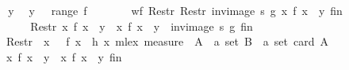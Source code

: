\begin{isabellebody}
\ \ \isamarkupfalse%
{\isacharminus}{\kern0pt}\isanewline
\ \ \ \ \isamarkupfalse%
\ y\ \isamarkupfalse%
\ {\isachardoublequoteopen}y\ {\isasymin}\ \ range\ f{\isachardoublequoteclose}\isanewline
\ \ \ \ \isamarkupfalse%
\ \isamarkupfalse%
\ {\isachardoublequoteopen}wf\ {\isacharparenleft}{\kern0pt}Restr\ {\isacharparenleft}{\kern0pt}Restr\ {\isacharparenleft}{\kern0pt}inv{\isacharunderscore}{\kern0pt}image\ s\ g{\isacharparenright}{\kern0pt}\ {\isacharbraceleft}{\kern0pt}x{\isachardot}{\kern0pt}\ f\ x\ {\isacharequal}{\kern0pt}\ y{\isacharbraceright}{\kern0pt}{\isacharparenright}{\kern0pt}\ {\isacharquery}{\kern0pt}fin{\isacharparenright}{\kern0pt}{\isachardoublequoteclose}\isanewline
\ \ \ \ \isamarkupfalse%
{\isacharminus}{\kern0pt}\isanewline
\ \ \ \ \ \ \isamarkupfalse%
\ {\isachardoublequoteopen}Restr\ {\isacharparenleft}{\kern0pt}{\isacharbraceleft}{\kern0pt}x{\isachardot}{\kern0pt}\ f\ x\ {\isacharequal}{\kern0pt}\ y{\isacharbraceright}{\kern0pt}\ {\isasymtimes}\ {\isacharbraceleft}{\kern0pt}x{\isachardot}{\kern0pt}\ f\ x\ {\isacharequal}{\kern0pt}\ y{\isacharbraceright}{\kern0pt}\ {\isasyminter}\ {\isacharparenleft}{\kern0pt}inv{\isacharunderscore}{\kern0pt}image\ s\ g{\isacharparenright}{\kern0pt}{\isacharparenright}{\kern0pt}\ {\isacharquery}{\kern0pt}fin\ {\isasymsubseteq}\ \isanewline
\ \ \ \ \ \ \ \ Restr\ {\isacharparenleft}{\kern0pt}{\isacharparenleft}{\kern0pt}{\isacharparenleft}{\kern0pt}{\isasymlambda}\ x{\isachardot}{\kern0pt}\ {}\ {\isacharasterisk}{\kern0pt}\ f\ x\ {\isacharminus}{\kern0pt}\ h\ x{\isacharparenright}{\kern0pt}\ {\isacharless}{\kern0pt}{\isacharasterisk}{\kern0pt}mlex{\isacharasterisk}{\kern0pt}{\isachargreater}{\kern0pt}\ measure\ {\isacharparenleft}{\kern0pt}{\isasymlambda}\ {\isacharparenleft}{\kern0pt}A\ {\isacharcolon}{\kern0pt}{\isacharcolon}{\kern0pt}\ {\isacharprime}{\kern0pt}a\ set{\isacharcomma}{\kern0pt}\ B\ {\isacharcolon}{\kern0pt}{\isacharcolon}{\kern0pt}\ {\isacharprime}{\kern0pt}a\ set{\isacharparenright}{\kern0pt}{\isachardot}{\kern0pt}\ card\ A{\isacharparenright}{\kern0pt}{\isacharparenright}{\kern0pt}\ {\isasyminter}\ \isanewline
\ \ \ \ \ \ \ \ {\isacharbraceleft}{\kern0pt}x{\isachardot}{\kern0pt}\ f\ x\ {\isacharequal}{\kern0pt}\ y{\isacharbraceright}{\kern0pt}\ {\isasymtimes}\ {\isacharbraceleft}{\kern0pt}x{\isachardot}{\kern0pt}\ f\ x\ {\isacharequal}{\kern0pt}\ y{\isacharbraceright}{\kern0pt}{\isacharparenright}{\kern0pt}\ {\isacharquery}{\kern0pt}fin{\isachardoublequoteclose}\isanewline

\end{isabellebody}
